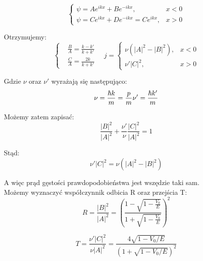 \begin{equation*}
    \begin{cases}
        \psi = A e^{ikx} + B e^{-ikx}, & x < 0 \\
        \psi = C e^{ikx} + D e^{-ikx} = C e^{ikx}, & x > 0
    \end{cases}
\end{equation*}

Otrzymujemy:
\begin{equation*}
    \left\{
    \begin{aligned}
        & \frac{B}{A} = \frac{k - k'}{k + k'} \\
        & \frac{C}{A} = \frac{2k}{k + k'}
    \end{aligned}
    \right.
    \quad
    j = 
    \begin{cases}
        \nu \left( |A|^2 - |B|^2 \right), & x < 0 \\
        \nu' |C|^2, & x > 0
    \end{cases}
\end{equation*}

Gdzie $\nu$ oraz $\nu'$ wyrażają się następująco:
\begin{equation*}
    \nu = \frac{\hbar k}{m} = \frac{p}{m} \\
    \nu' = \frac{\hbar k'}{m}
\end{equation*}

Możemy zatem zapisać:
\begin{equation*}
    \frac{\left| B \right|^2}{\left| A \right|^2} + \frac{\nu'}{\nu} \frac{\left| C \right|^2}{\left| A \right|^2} = 1
\end{equation*}

Stąd:
\begin{equation*}
    \nu' \left| C \right| ^2 = \nu \left( \left| A \right| ^2 - \left| B \right| ^2 \right)
\end{equation*}

A więc prąd gęstości prawdopodobieństwa jest wszędzie taki sam. \\

Możemy wyznaczyć współczynnik odbicia R oraz przejścia T:
\begin{equation*}
    R = \frac{\left| B \right|^2}{\left| A \right|^2} = \left( \frac{1 - \sqrt{1 - \frac{V_0}{E}}}{1 + \sqrt{1 - \frac{V_0}{E}}} \right)^2
\end{equation*}

\begin{equation*}
    T = \frac{\nu' \left| C \right| ^2}{\nu \left| A \right| ^2} = \frac{4 \sqrt{1 - V_0/E}}{\left( 1 + \sqrt{1 - V_0/E} \right)^2}
\end{equation*}

